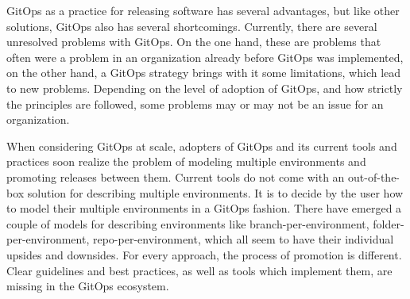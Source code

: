 %


\noindent
GitOps as a practice for releasing software has several advantages,
but like other solutions, GitOps also has several shortcomings.
Currently, there are several unresolved problems with GitOps.
On the one hand, these are problems that often 
were a problem in an organization already before GitOps was implemented,
on the other hand, a GitOps strategy brings with it some limitations,
which lead to new problems.
Depending on the level of adoption of GitOps,
and how strictly the principles are followed,
some problems may or may not be an issue for an organization.
\bigskip

\noindent
When considering GitOps at scale,
adopters of GitOps and its current tools and practices
soon realize the problem of
modeling multiple environments
and promoting releases between them.
Current tools do not come with an out-of-the-box solution
for describing multiple environments.
It is to decide by the user
how to model their multiple environments in a GitOps fashion.
There have emerged a couple of models for describing environments
like branch-per-environment,
folder-per-environment, repo-per-environment,
which all seem to have their individual upsides and downsides.
For every approach, the process of promotion is different.
Clear guidelines and best practices,
as well as tools which implement them,
are missing in the GitOps ecosystem.








